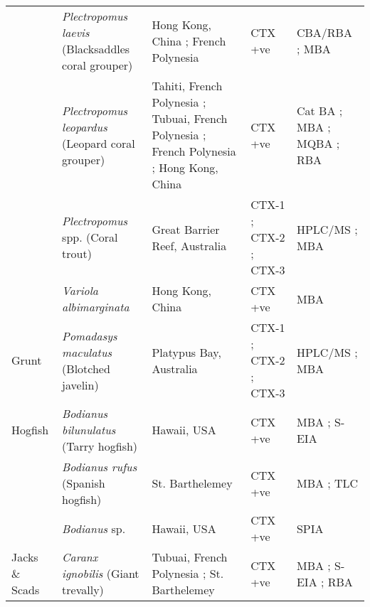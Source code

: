 \documentclass[12pt]{article}
\begin{document}
\begin{longtable}{  | p{2cm} | p{3cm} | p{4.5cm}  | p{2cm} | p{3cm}  | }
  &  \emph{Plectropomus laevis} (Blacksaddles coral grouper) & Hong Kong, China \cite{wong2008features}; French Polynesia \cite{chinain2014mail} & CTX +ve \cite{wong2008features,chinain2014mail} & CBA/RBA \cite{chinain2014mail}; MBA \cite{wong2008features}\\
  & \emph{Plectropomus leopardus}  (Leopard coral grouper) & Tahiti, French Polynesia \cite{pompon1983ciguatera}; Tubuai, French Polynesia \cite{darius2007ciguatera}; French Polynesia \cite{bagnis1987use}; Hong Kong, China \cite{wong2005study} & CTX +ve \cite{wong2005study,darius2007ciguatera,bagnis1987use,pompon1983ciguatera} & Cat BA \cite{bagnis1987use}; MBA \cite{wong2005study,bagnis1987use,pompon1983ciguatera}; MQBA \cite{bagnis1987use}; RBA \cite{darius2007ciguatera} \\
  & \emph{Plectropomus} spp. (Coral trout) & Great Barrier Reef, Australia \cite{lewis1992multiple} & CTX-1 \cite{lewis1992multiple}; CTX-2 \cite{lewis1992multiple}; CTX-3 \cite{lewis1992multiple} & HPLC/MS \cite{lewis1992multiple}; MBA \cite{lewis1992multiple} \\
  & \emph{Variola albimarginata}  & Hong Kong, China \cite{wong2008features} & CTX +ve \cite{wong2008features} & MBA \cite{wong2008features} \\
  \hline
 Grunt & \emph{Pomadasys maculatus} (Blotched javelin) & Platypus Bay, Australia \cite{lewis1992multiple} & CTX-1 \cite{lewis1992multiple}; CTX-2 \cite{lewis1992multiple}; CTX-3 \cite{lewis1992multiple} & HPLC/MS \cite{lewis1992multiple}; MBA \cite{lewis1992multiple} \\
 \hline
Hogfish  &  \emph{Bodianus bilunulatus} (Tarry hogfish) & Hawaii, USA \cite{hokama1993evaluation} & CTX +ve \cite{hokama1993evaluation} & MBA \cite{hokama1993evaluation}; S-EIA \cite{hokama1993evaluation} \\
  & \emph{Bodianus rufus} (Spanish hogfish)  & St. Barthelemey \cite{vernoux1986heterogeneity} & CTX +ve \cite{vernoux1986heterogeneity} & MBA \cite{vernoux1986heterogeneity}; TLC \cite{vernoux1986heterogeneity} \\
  & \emph{Bodianus} sp. & Hawaii, USA \cite{hokama1990simplified} & CTX +ve \cite{hokama1990simplified} & SPIA \cite{hokama1990simplified}\\
  \hline
Jacks \& Scads  &  \emph{Caranx ignobilis} (Giant trevally) & Tubuai, French Polynesia \cite{darius2007ciguatera}; St. Barthelemey \cite{vernoux1986heterogeneity} & CTX +ve \cite{hokama1993evaluation,darius2007ciguatera} & MBA \cite{hokama1993evaluation}; S-EIA \cite{hokama1993evaluation}; RBA \cite{darius2007ciguatera} \\

\end{longtable}
\end{document}
